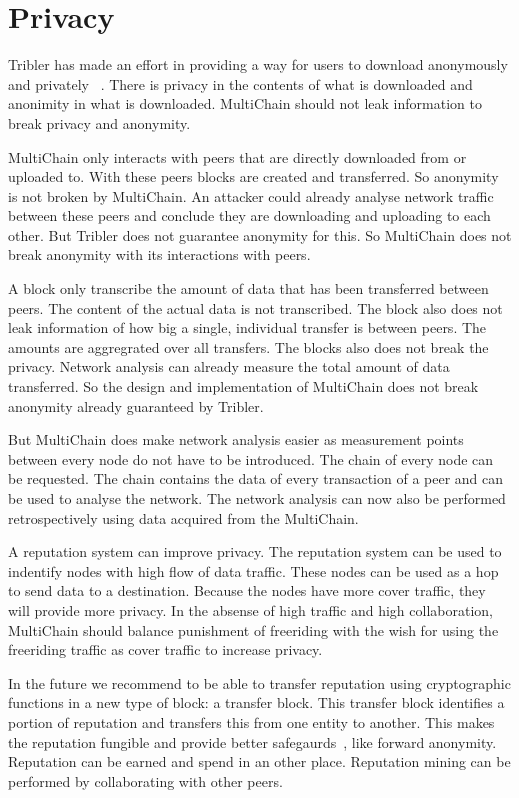 \section{Privacy}
Tribler has made an effort in providing a way for users to download anonymously and privately
~\cite{Plak-anonymous,ruigrok-anonymous,tanaskoski-anonymous}.
There is privacy in the contents of what is downloaded and anonimity in what is downloaded.
MultiChain should not leak information to break privacy and anonymity.

MultiChain only interacts with peers that are directly downloaded from or uploaded to.
With these peers blocks are created and transferred.
So anonymity is not broken by MultiChain.
An attacker could already analyse network traffic between these peers
and conclude they are downloading and uploading to each other.
But Tribler does not guarantee anonymity for this.
So MultiChain does not break anonymity with its interactions with peers.

A block only transcribe the amount of data that has been transferred between peers.
The content of the actual data is not transcribed.
The block also does not leak information of how big a single, individual transfer is between peers.
The amounts are aggregrated over all transfers.
The blocks also does not break the privacy.
Network analysis can already measure the total amount of data transferred.
So the design and implementation of MultiChain does not break anonymity already guaranteed by Tribler.

But MultiChain does make network analysis easier as measurement points between every node do not have to be introduced.
The chain of every node can be requested.
The chain contains the data of every transaction of a peer and can be used to analyse the network.
The network analysis can now also be performed retrospectively using data acquired from the MultiChain.

A reputation system can improve privacy.
The reputation system can be used to indentify nodes with high flow of data traffic.
These nodes can be used as a hop to send data to a destination.
Because the nodes have more cover traffic, they will provide more privacy\cite{acquisti-economics}.
In the absense of high traffic and high collaboration, MultiChain should balance punishment of freeriding
with the wish for using the freeriding traffic as cover traffic to increase privacy\cite{dingledine-reputation}.

In the future we recommend to be able to transfer reputation using cryptographic functions in a new type of block: a transfer block.
This transfer block identifies a portion of reputation and transfers this from one entity to another.
This makes the reputation fungible and provide better safegaurds~\cite{acquisti-economics}, like forward anonymity.
Reputation can be earned and spend in an other place.
Reputation mining can be performed by collaborating with other peers.
